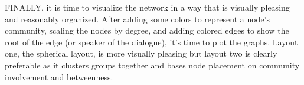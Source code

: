 \documentclass[]{article}
\newenvironment{Shaded}{\begin{snugshade}}{\end{snugshade}}
\newcommand{\KeywordTok}[1]{\textcolor[rgb]{0.13,0.29,0.53}{\textbf{#1}}}
\newcommand{\DataTypeTok}[1]{\textcolor[rgb]{0.13,0.29,0.53}{#1}}
\newcommand{\DecValTok}[1]{\textcolor[rgb]{0.00,0.00,0.81}{#1}}
\newcommand{\StringTok}[1]{\textcolor[rgb]{0.31,0.60,0.02}{#1}}
\newcommand{\CommentTok}[1]{\textcolor[rgb]{0.56,0.35,0.01}{\textit{#1}}}
\newcommand{\ControlFlowTok}[1]{\textcolor[rgb]{0.13,0.29,0.53}{\textbf{#1}}}
\newcommand{\OperatorTok}[1]{\textcolor[rgb]{0.81,0.36,0.00}{\textbf{#1}}}
\newcommand{\NormalTok}[1]{#1}
\begin{document}
\begin{Shaded}
\end{Shaded}

FINALLY, it is time to visualize the network in a way that is visually
pleasing and reasonably organized. After adding some colors to represent
a node's community, scaling the nodes by degree, and adding colored
edges to show the root of the edge (or speaker of the dialogue), it's
time to plot the graphs. Layout one, the spherical layout, is more
visually pleasing but layout two is clearly preferable as it clusters
groups together and bases node placement on community involvement and
betweenness.
\end{document}
